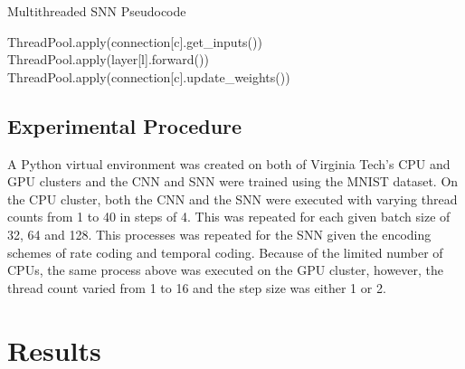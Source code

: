 \documentclass[journal]{IEEEtran}
\begin{document}
\begin{algorithm}
\caption{Multithreaded SNN Pseudocode}
\begin{algorithmic}
     ThreadPool.apply(connection[c].get\_inputs())
    \ENDFOR
     ThreadPool.apply(layer[l].forward())
    \ENDFOR
     ThreadPool.apply(connection[c].update\_weights())
    \ENDFOR
\ENDFOR
\end{algorithmic}
\label{alg_snn}
\end{algorithm}

\subsection{Experimental Procedure} 
A Python virtual environment was created on both of Virginia Tech's CPU and GPU clusters and the CNN and SNN were trained using the MNIST dataset. On the CPU cluster, both the CNN and the SNN were executed with varying thread counts from 1 to 40 in steps of 4. This was repeated for each given batch size of 32, 64 and 128. This processes was repeated for the SNN given the encoding schemes of rate coding and temporal coding. Because of the limited number of CPUs, the same process above was executed on the GPU cluster, however, the thread count varied from 1 to 16 and the step size was either 1 or 2.


\section{Results}
\end{document}
